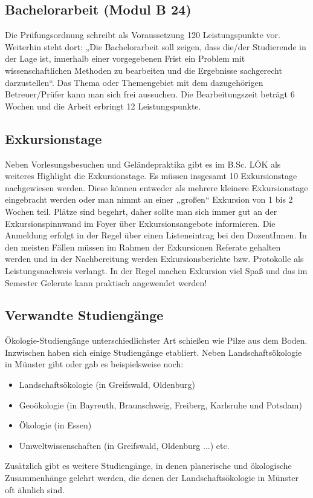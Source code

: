 \subsection*{Bachelorarbeit (Modul B 24)}
Die Prüfungsordnung schreibt als Voraussetzung 120 Leistungspunkte vor. Weiterhin steht dort: „Die Bachelorarbeit soll zeigen, dass die/der Studierende in der Lage ist, innerhalb einer vorgegebenen Frist ein Problem mit wissenschaftlichen Methoden zu bearbeiten und die Ergebnisse sachgerecht darzustellen“. Das Thema oder Themengebiet mit dem dazugehörigen Betreuer/Prüfer kann man sich frei aussuchen. Die Bearbeitungszeit beträgt 6 Wochen und die Arbeit erbringt 12 Leistungspunkte.

\subsection*{Exkursionstage}
Neben Vorlesungsbesuchen und Geländepraktika gibt es im B.Sc. LÖK als weiteres Highlight die Exkursionstage. Es müssen insgesamt 10 Exkursionstage nachgewiesen werden. Diese können entweder als mehrere kleinere Exkursionstage eingebracht werden oder man nimmt an einer „großen“ Exkursion von 1 bis 2 Wochen teil. Plätze sind begehrt, daher sollte man sich immer gut an der Exkursionspinnwand im Foyer über Exkursionsangebote informieren. Die Anmeldung erfolgt in der Regel über einen Listeneintrag bei den DozentInnen. In den meisten Fällen müssen im Rahmen der Exkursionen Referate gehalten werden und in der Nachbereitung werden Exkursionsberichte bzw. Protokolle als Leistungsnachweis verlangt. In der Regel machen Exkursion viel Spaß und das im Semester Gelernte kann  praktisch angewendet werden!

\subsection*{Verwandte Studiengänge}
Ökologie-Studiengänge unterschiedlichster Art schießen wie Pilze aus dem Boden. Inzwischen haben sich einige Studiengänge etabliert. Neben Landschaftsökologie in Münster gibt oder gab es beispielsweise noch:
\begin{itemize}
  \item Landschaftsökologie (in Greifswald, Oldenburg)
  \item Geoökologie (in Bayreuth, Braunschweig, Freiberg, Karlsruhe und Potsdam)
  \item Ökologie (in Essen)
  \item Umweltwissenschaften (in Greifswald, Oldenburg ...) etc.
\end{itemize}
Zusätzlich gibt es weitere Studiengänge, in denen planerische und ökologische Zusammenhänge gelehrt werden, die denen der Landschaftsökologie in Münster oft ähnlich sind. 

